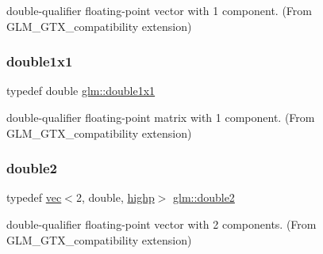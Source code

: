 double-\/qualifier floating-\/point vector with 1 component. (From G\+L\+M\+\_\+\+G\+T\+X\+\_\+compatibility extension) 

\mbox{\label{group__gtx__compatibility_ga1c87d3042377335eb050a20ab0ec148a}} 
\subsubsection{\texorpdfstring{double1x1}{double1x1}}
{\footnotesize\ttfamily typedef double \mbox{\hyperlink{group__gtx__compatibility_ga1c87d3042377335eb050a20ab0ec148a}{glm\+::double1x1}}}



double-\/qualifier floating-\/point matrix with 1 component. (From G\+L\+M\+\_\+\+G\+T\+X\+\_\+compatibility extension) 

\mbox{\label{group__gtx__compatibility_gaadf812a4d848bf77684844269e1d44eb}} 
\subsubsection{\texorpdfstring{double2}{double2}}
{\footnotesize\ttfamily typedef \mbox{\hyperlink{structglm_1_1vec}{vec}}$<$2, double, \mbox{\hyperlink{namespaceglm_a36ed105b07c7746804d7fdc7cc90ff25ac6f7eab42eacbb10d59a58e95e362074}{highp}}$>$ \mbox{\hyperlink{group__gtx__compatibility_gaadf812a4d848bf77684844269e1d44eb}{glm\+::double2}}}



double-\/qualifier floating-\/point vector with 2 components. (From G\+L\+M\+\_\+\+G\+T\+X\+\_\+compatibility extension) 

\mbox{\label{group__gtx__compatibility_ga38235425d2401904456ecbc342d87453}} 
